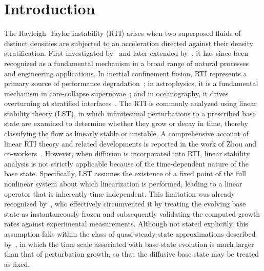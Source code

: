 \documentclass[11pt]{article}
\begin{document}
\section{Introduction}%
The Rayleigh--Taylor instability (RTI) arises when two superposed fluids of distinct densities are subjected to an acceleration directed against their density stratification. First investigated by~\citet{lord_rayleigh-1879} and later extended by~\citet{taylor-1950}, it has since been recognized as a fundamental mechanism in a broad range of natural processes and engineering applications. In inertial confinement fusion, RTI represents a primary source of performance degradation~\citep{lindl-1995}; in astrophysics, it is a fundamental mechanism in core-collapse supernovae~\citep{muller-2020}; and in oceanography, it drives overturning at stratified interfaces~\citep{turner-1973}.
The RTI is commonly analyzed using linear stability theory (LST), in which infinitesimal perturbations to a prescribed base state are examined to determine whether they grow or decay in time, thereby classifying the flow as linearly stable or unstable. A comprehensive account of linear RTI theory and related developments is reported in the work of Zhou and co-workers~\citep{zhou-2017-a,zhou-2017-b,zhou-et-al-2021}. However, when diffusion is incorporated into RTI, linear stability analysis is not strictly applicable because of the time-dependent nature of the base state. Specifically, LST assumes the existence of a fixed point of the full nonlinear system about which linearization is performed, leading to a linear operator that is inherently time independent. This limitation was already recognized by~\citet{duff-harlow-hirt-1962}, who effectively circumvented it by treating the evolving base state as instantaneously frozen and subsequently validating the computed growth rates against experimental measurements. Although not stated explicitly, this assumption falls within the class of quasi-steady-state approximations described by~\citet{tan-homsy-1986}, in which the time scale associated with base-state evolution is much larger than that of perturbation growth, so that the diffusive base state may be treated as fixed.
\end{document}
